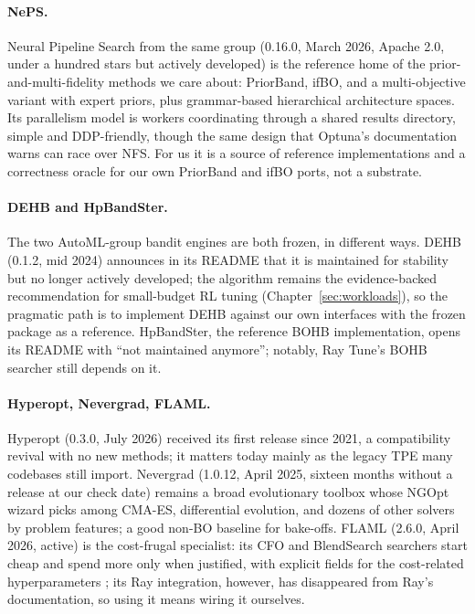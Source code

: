 \paragraph{NePS.}
Neural Pipeline Search from the same group (0.16.0, March 2026, Apache
2.0, under a hundred stars but actively developed) is the reference home
of the prior-and-multi-fidelity methods we care about: PriorBand, ifBO,
and a multi-objective variant with expert priors, plus grammar-based
hierarchical architecture spaces. Its parallelism model is workers
coordinating through a shared results directory, simple and DDP-friendly,
though the same design that Optuna's documentation warns can race over
NFS. For us it is a source of reference implementations and a
correctness oracle for our own PriorBand and ifBO ports, not a substrate.

\paragraph{DEHB and HpBandSter.}
The two AutoML-group bandit engines are both frozen, in different ways.
DEHB (0.1.2, mid 2024) announces in its README that it is maintained for
stability but no longer actively developed; the algorithm remains the
evidence-backed recommendation for small-budget RL tuning
(Chapter~\ref{sec:workloads}), so the pragmatic path is to implement DEHB
against our own interfaces with the frozen package as a reference.
HpBandSter, the reference BOHB implementation, opens its README with
``not maintained anymore''; notably, Ray Tune's BOHB searcher still
depends on it.

\paragraph{Hyperopt, Nevergrad, FLAML.}
Hyperopt (0.3.0, July 2026) received its first release since 2021, a
compatibility revival with no new methods; it matters today mainly as the
legacy TPE many codebases still import. Nevergrad (1.0.12, April 2025,
sixteen months without a release at our check date) remains a broad
evolutionary toolbox whose NGOpt wizard picks among CMA-ES, differential
evolution, and dozens of other solvers by problem features; a good
non-BO baseline for bake-offs. FLAML (2.6.0, April 2026, active) is the
cost-frugal specialist: its CFO and BlendSearch searchers start cheap and
spend more only when justified, with explicit fields for the cost-related
hyperparameters \citep{wang2021flaml}; its Ray integration, however, has
disappeared from Ray's documentation, so using it means wiring it
ourselves.

